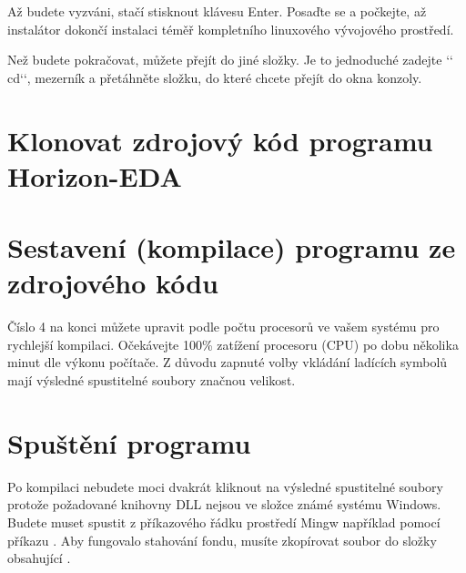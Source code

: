 \documentclass[letterpaper,10pt,czech]{sphinxmanual}
\begin{document}
Až budete vyzváni, stačí stisknout klávesu Enter. Posaďte se a počkejte, až instalátor dokončí
instalaci téměř kompletního linuxového vývojového prostředí.

Než budete pokračovat, můžete přejít do jiné složky. Je to jednoduché
zadejte {}`{}` cd{}`{}`, mezerník a přetáhněte složku, do které chcete přejít
do okna konzoly.


\section{Klonovat zdrojový kód programu Horizon-EDA}
\label{\detokenize{build-win32:klonovat-zdrojovy-kod-programu-horizon-eda}}
\begin{sphinxVerbatim}[commandchars=\\\{\}]
  
 
\end{sphinxVerbatim}


\section{Sestavení (kompilace) programu ze zdrojového kódu}
\label{\detokenize{build-win32:sestaveni-kompilace-programu-ze-zdrojoveho-kodu}}
\begin{sphinxVerbatim}[commandchars=\\\{\}]
  
\end{sphinxVerbatim}

Číslo 4 na konci můžete upravit podle počtu procesorů ve vašem systému pro rychlejší kompilaci. Očekávejte 100\% zatížení procesoru (CPU) po dobu několika minut dle výkonu počítače. Z důvodu zapnuté volby vkládání ladících symbolů mají výsledné spustitelné soubory značnou velikost.


\section{Spuštění programu}
\label{\detokenize{build-win32:spusteni-programu}}
Po kompilaci nebudete moci dvakrát kliknout na výsledné spustitelné soubory protože požadované knihovny DLL nejsou ve složce známé systému Windows. Budete muset spustit z příkazového řádku prostředí Mingw například pomocí příkazu .
Aby fungovalo stahování fondu, musíte zkopírovat soubor  do složky obsahující .
\end{document}
